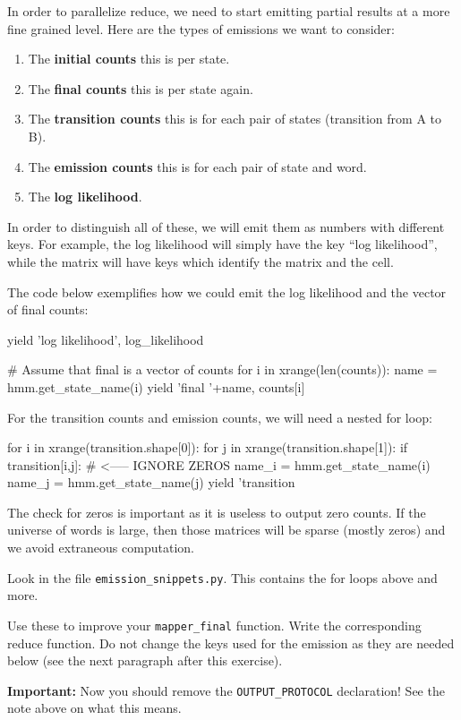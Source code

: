 In order to parallelize reduce, we need to start emitting partial results at a
more fine grained level. Here are the types of emissions we want to consider:

\begin{enumerate}
\item The \textbf{initial counts} this is per state.
\item The \textbf{final counts} this is per state again.
\item The \textbf{transition counts} this is for each pair of states (transition from A to B).
\item The \textbf{emission counts} this is for each pair of state and word.
\item The \textbf{log likelihood}.
\end{enumerate}

In order to distinguish all of these, we will emit them as numbers with
different keys. For example, the log likelihood will simply have the key ``log
likelihood'', while the matrix will have keys which identify the matrix and the
cell.

The code below exemplifies how we could emit the log likelihood and the vector
of final counts:

\begin{python}
yield 'log likelihood', log_likelihood

# Assume that final is a vector of counts
for i in xrange(len(counts)):
    name = hmm.get_state_name(i)
    yield 'final '+name, counts[i]
\end{python} %

For the transition counts and emission counts, we will need a nested for loop:

\begin{python}
for i in xrange(transition.shape[0]):
    for j in xrange(transition.shape[1]):
        if transition[i,j]: # <----- IGNORE ZEROS
            name_i = hmm.get_state_name(i)
            name_j = hmm.get_state_name(j)
            yield 'transition %
\end{python}

The check for zeros is important as it is useless to output zero counts. If the
universe of words is large, then those matrices will be sparse (mostly zeros)
and we avoid extraneous computation.

\begin{exercise}
Look in the file \verb+emission_snippets.py+. This contains the for loops above
and more.

Use these to improve your \verb+mapper_final+ function. Write the corresponding
reduce function. Do not change the keys used for the emission as they are
needed below (see the next paragraph after this exercise).

\textbf{Important:} Now you should remove the \verb+OUTPUT_PROTOCOL+
declaration! See the note above on what this means.
\end{exercise}

